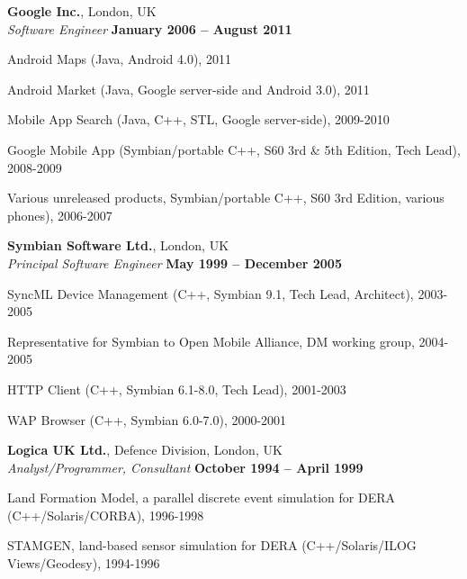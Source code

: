 \documentclass[line]{resume}
\begin{document}
\begin{resume}
    \textbf{Google Inc.}, London, UK \vspace{2mm}\\\vspace{1mm}%
    \textsl{Software Engineer} \hfill \textbf{January 2006 -- August 2011}\vspace{-3mm}\\\vspace{-1mm}%
    \begin{list2}
        \item Android Maps (Java,  Android 4.0), 2011
        \item Android Market (Java,  Google server-side and Android 3.0), 2011
        \item Mobile App Search (Java, C++, STL, Google server-side), 2009-2010
        \item Google Mobile App (Symbian/portable C++, S60 3rd \& 5th Edition, Tech Lead), 2008-2009
        \item Various unreleased products, Symbian/portable C++, S60 3rd Edition, various phones), 2006-2007
    \end{list2}\vspace{-1.5mm}

    \textbf{Symbian Software Ltd.}, London, UK \vspace{2mm}\\\vspace{1mm}%
    \textsl{Principal Software Engineer} \hfill \textbf{May 1999 -- December 2005}\vspace{-3mm}\\\vspace{-1mm}%
    \begin{list2}
        \item SyncML Device Management (C++, Symbian 9.1, Tech Lead, Architect), 2003-2005
        \item Representative for Symbian to Open Mobile Alliance, DM working group, 2004-2005
        \item HTTP Client (C++, Symbian 6.1-8.0, Tech Lead), 2001-2003
        \item WAP Browser (C++, Symbian 6.0-7.0), 2000-2001
    \end{list2}\vspace{-1.5mm}
   
    \textbf{Logica UK Ltd.}, Defence Division, London, UK \vspace{2mm}\\\vspace{1mm}%
    \textsl{Analyst/Programmer, Consultant} \hfill \textbf{October 1994 -- April 1999}\vspace{-3mm}\\\vspace{-1mm}%
    \begin{list2}
        \item Land Formation Model, a parallel discrete event simulation for DERA (C++/Solaris/CORBA), 1996-1998
        \item STAMGEN, land-based sensor simulation for DERA (C++/Solaris/ILOG Views/Geodesy), 1994-1996
    \end{list2}\vspace{-1.5mm}


\end{resume}
\end{document}
